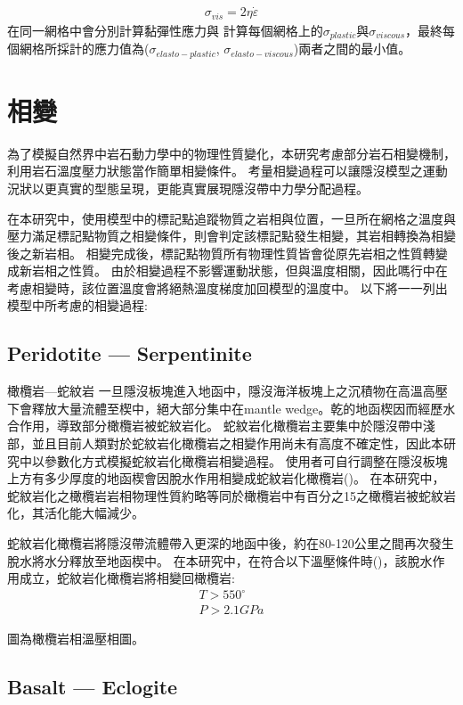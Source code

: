 \begin{align}
    \sigma_{vis} = 2\eta\dot\varepsilon \label{eqn:viscous tensor}
\end{align}
在同一網格中會分別計算黏彈性應力與
計算每個網格上的$\sigma_{plastic}$與$\sigma_{viscous}$，最終每個網格所採計的應力值為($\sigma_{elasto-plastic}$, $\sigma_{elasto-viscous}$)兩者之間的最小值。
\section{相變}

為了模擬自然界中岩石動力學中的物理性質變化，本研究考慮部分岩石相變機制，利用岩石溫度壓力狀態當作簡單相變條件。
考量相變過程可以讓隱沒模型之運動況狀以更真實的型態呈現，更能真實展現隱沒帶中力學分配過程。

在本研究中，使用模型中的標記點追蹤物質之岩相與位置，一旦所在網格之溫度與壓力滿足標記點物質之相變條件，則會判定該標記點發生相變，其岩相轉換為相變後之新岩相。
相變完成後，標記點物質所有物理性質皆會從原先岩相之性質轉變成新岩相之性質。
由於相變過程不影響運動狀態，但與溫度相關，因此嗎行中在考慮相變時，該位置溫度會將絕熱溫度梯度加回模型的溫度中。
以下將一一列出模型中所考慮的相變過程:

\subsection{Peridotite --- Serpentinite}
橄欖岩---蛇紋岩
一旦隱沒板塊進入地函中，隱沒海洋板塊上之沉積物在高溫高壓下會釋放大量流體至楔中，絕大部分集中在mantle wedge。乾的地函楔因而經歷水合作用，導致部分橄欖岩被蛇紋岩化。
蛇紋岩化橄欖岩主要集中於隱沒帶中淺部，並且目前人類對於蛇紋岩化橄欖岩之相變作用尚未有高度不確定性，因此本研究中以參數化方式模擬蛇紋岩化橄欖岩相變過程。
使用者可自行調整在隱沒板塊上方有多少厚度的地函楔會因脫水作用相變成蛇紋岩化橄欖岩(\citealp{Tan2012})。
在本研究中，蛇紋岩化之橄欖岩岩相物理性質約略等同於橄欖岩中有百分之15之橄欖岩被蛇紋岩化，其活化能大幅減少。
   
蛇紋岩化橄欖岩將隱沒帶流體帶入更深的地函中後，約在80-120公里之間再次發生脫水將水分釋放至地函楔中。
在本研究中，在符合以下溫壓條件時(\citealp{Ulmer1995})，該脫水作用成立，蛇紋岩化橄欖岩將相變回橄欖岩:
\begin{align}
T> 550 ^{\circ}\\
P > 2.1 GPa
\end{align}

圖為橄欖岩相溫壓相圖。

\subsection{Basalt --- Eclogite}

